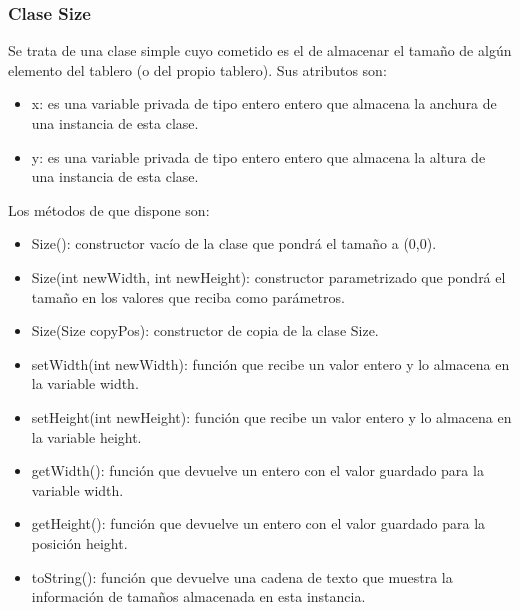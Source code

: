 \documentclass[a4paper,12pt,twoside,openright]{report}
\begin{document}
      \subsubsection{Clase Size}
      Se trata de una clase simple cuyo cometido es el de almacenar el tamaño de algún elemento del tablero (o del propio tablero).
      Sus atributos son:
      \begin{itemize}
       \item x: es una variable privada de tipo entero entero que almacena la anchura de una instancia de esta clase.
       \item y: es una variable privada de tipo entero entero que almacena la altura de una instancia de esta clase.
      \end{itemize}
      Los métodos de que dispone son:
      \begin{itemize}
       \item Size(): constructor vacío de la clase que pondrá el tamaño a (0,0).
       \item Size(int newWidth, int newHeight): constructor parametrizado que pondrá el tamaño en los valores que reciba como parámetros.
       \item Size(Size copyPos): constructor de copia de la clase Size.
       \item setWidth(int newWidth): función que recibe un valor entero y lo almacena en la variable width.
       \item setHeight(int newHeight): función que recibe un valor entero y lo almacena en la variable height.
       \item getWidth(): función que devuelve un entero con el valor guardado para la variable width.
       \item getHeight(): función que devuelve un entero con el valor guardado para la posición height.
       \item toString(): función que devuelve una cadena de texto que muestra la información de tamaños almacenada en esta instancia.
      \end{itemize}
\end{document}
